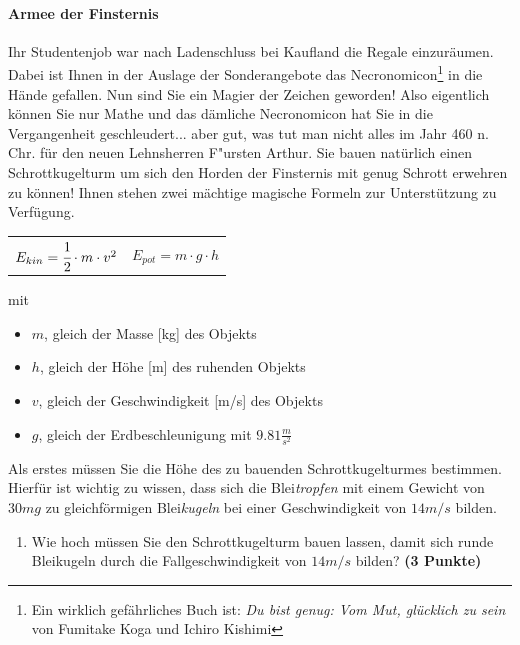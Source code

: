 \documentclass[a4paper, 9pt]{scrartcl}\usepackage[]{graphicx}\usepackage[]{xcolor}
\begin{document}
\paragraph{Armee der Finsternis}



Ihr Studentenjob war nach Ladenschluss bei Kaufland die Regale
einzur{\"a}umen. Dabei ist Ihnen in der Auslage der Sonderangebote das
Necronomicon\footnote{Ein wirklich gef{\"a}hrliches Buch ist:
  \textit{Du bist genug: Vom Mut, gl{\"u}cklich zu sein} von Fumitake Koga und
  Ichiro Kishimi} in die H{\"a}nde gefallen. Nun sind Sie ein Magier der
Zeichen geworden! Also eigentlich k{\"o}nnen Sie nur Mathe und das d{\"a}mliche
Necronomicon hat Sie in die Vergangenheit geschleudert... aber gut, was tut
man nicht alles im Jahr 460 n. Chr. f{\"u}r den neuen Lehnsherren
F{"u}rsten Arthur. Sie bauen nat{\"u}rlich einen Schrottkugelturm um sich den
Horden der Finsternis mit genug Schrott erwehren zu k{\"o}nnen! Ihnen stehen
zwei m{\"a}chtige magische Formeln zur Unterst{\"u}tzung zu Verf{\"u}gung.

\begin{center}
  \begin{tabular}{cc}
    $E_{kin} = \cfrac{1}{2}\cdot m \cdot v^2$ & $E_{pot} = m \cdot g \cdot h$\\
  \end{tabular}
\end{center}

mit

\begin{itemize}
\item $m$, gleich der Masse [kg] des Objekts
\item $h$, gleich der H{\"o}he [m] des ruhenden Objekts
\item $v$, gleich der Geschwindigkeit [m/s] des Objekts
\item $g$, gleich der Erdbeschleunigung mit $9.81 \tfrac{m}{s^2}$ 
\end{itemize}

Als erstes m{\"u}ssen Sie die H{\"o}he des zu bauenden Schrottkugelturmes
bestimmen. Hierf{\"u}r ist wichtig zu wissen, dass sich die
Blei\textit{tropfen} mit einem Gewicht von $30mg$ zu
gleichf{\"o}rmigen Blei\textit{kugeln} bei einer Geschwindigkeit von
$14m/s$ bilden.

\begin{enumerate}
\item Wie hoch m{\"u}ssen Sie den Schrottkugelturm bauen lassen, damit sich
  runde Bleikugeln durch die Fallgeschwindigkeit von $14m/s$ bilden?
  \textbf{(3 Punkte)}
\end{enumerate}
\end{document}
